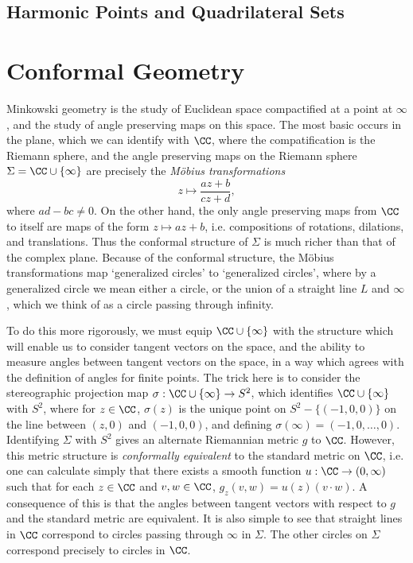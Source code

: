 \section{Harmonic Points and Quadrilateral Sets}





\chapter{Conformal Geometry}

Minkowski geometry is the study of Euclidean space compactified at a point at $\infty$, and the study of angle preserving maps on this space. The most basic occurs in the plane, which we can identify with $\CC$, where the compatification is the Riemann sphere, and the angle preserving maps on the Riemann sphere $\Sigma = \CC \cup \{ \infty \}$ are precisely the \emph{M\"{o}bius transformations}
%
\[ z \mapsto \frac{az + b}{cz + d}, \]
%
where $ad - bc \neq 0$. On the other hand, the only angle preserving maps from $\CC$ to itself are maps of the form $z \mapsto az + b$, i.e. compositions of rotations, dilations, and translations. Thus the conformal structure of $\Sigma$ is much richer than that of the complex plane. Because of the conformal structure, the M\"{o}bius transformations map `generalized circles' to `generalized circles', where by a generalized circle we mean either a circle, or the union of a straight line $L$ and $\infty$, which we think of as a circle passing through infinity.

To do this more rigorously, we must equip $\CC \cup \{ \infty \}$ with the structure which will enable us to consider tangent vectors on the space, and the ability to measure angles between tangent vectors on the space, in a way which agrees with the definition of angles for finite points. The trick here is to consider the stereographic projection map $\sigma: \CC \cup \{ \infty \} \to S^2$, which identifies $\CC \cup \{ \infty \}$ with $S^2$, where for $z \in \CC$, $\sigma(z)$ is the unique point on $S^2 - \{ (-1,0,0) \}$ on the line between $(z,0)$ and $(-1,0,0)$,
%
%
and defining $\sigma(\infty) = (-1,0,\dots,0)$. Identifying $\Sigma$ with $S^2$ gives an alternate Riemannian metric $g$ to $\CC$. However, this metric structure is \emph{conformally equivalent} to the standard metric on $\CC$, i.e. one can calculate simply that there exists a smooth function $u: \CC \to (0,\infty)$ such that for each $z \in \CC$ and $v,w \in \CC$, $g_z(v,w) = u(z) (v \cdot w)$. A consequence of this is that the angles between tangent vectors with respect to $g$ and the standard metric are equivalent. It is also simple to see that straight lines in $\CC$ correspond to circles passing through $\infty$ in $\Sigma$. The other circles on $\Sigma$ correspond precisely to circles in $\CC$.


